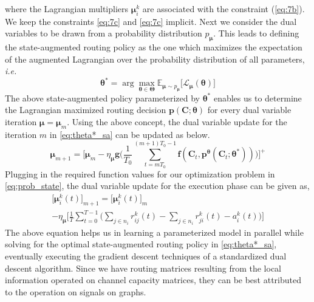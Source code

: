 \documentclass[lettersize,journal]{IEEEtran}
\begin{document}
where the Lagrangian multipliers $\bm{\mu}_i^k$ are associated with the constraint (\ref{eq:7b}). We keep the constraints \eqref{eq:7c} and \eqref{eq:7c} implicit. Next we consider the dual variables to be drawn from a probability distribution $p_{\bm{\mu}}$. This leads to defining the state-augmented routing policy as the one which maximizes the expectation of the augmented Lagrangian over the probability distribution of all parameters, \textit{i.e.}
\begin{equation} \label{eq:theta*_sa}
    \bm{\theta}^* = \arg \max_{\bm{\theta} \in \bm{\Theta}} \mathbb{E}_{\bm{\mu} \sim p_{\bm{\mu}}} \big[\mathcal{L}_{\bm{\mu}} (\bm{\theta}) \big]
\end{equation}
The above state-augmented policy parameterized by $\bm{\theta}^*$ enables us to determine the Lagrangian maximized routing decision $\mathbf{p}(\mathbf{C};\bm{\theta})$ for every dual variable iteration $\bm{\mu} = \bm{\mu}_m$. Using the above concept, the dual variable update for the iteration $m$ in \eqref{eq:theta*_sa} can be updated as below.
\begin{equation} \label{eq:mu_sa1}
    \bm{\mu}_{m+1} = \Bigg[ \bm{\mu}_m - \eta_{\bm{\mu}} \mathbf{g}\Biggl(\frac{1}{T_0} \sum_{t=mT_0}^{(m+1)T_0-1} \mathbf{f}(\mathbf{C}_t, \mathbf{p}^{\bm{\theta}}(\mathbf{C}_t;\bm{\theta}^*)) \Biggl) \Bigg]^+
\end{equation}
Plugging in the required function values for our optimization problem in \eqref{eq:prob_state}, the dual variable update for the execution phase can be given as,
\begin{multline} \label{eq:mu_sa2}
    \bigg[\bm{\mu}_i^k(t)\bigg]_{m+1} = \bigg[\bm{\mu}_i^k(t)\bigg]_m \\
    - \eta_{\bm{\mu}} \Bigg[ \frac{1}{T} \sum_{t=0}^{T-1} \Bigg( \sum_{j \in n_i} r_{ij}^k(t) - \sum_{j \in n_i} r_{ji}^k(t) - a_i^k(t) \bigg) \Bigg]
\end{multline}
The above equation helps us in learning a parameterized model in parallel while solving for the optimal state-augmented routing policy in \eqref{eq:theta*_sa}, eventually executing the gradient descent techniques of a standardized dual descent algorithm. Since we have routing matrices resulting from the local information operated on channel capacity matrices, they can be best attributed to the operation on signals on graphs. 
\end{document}
